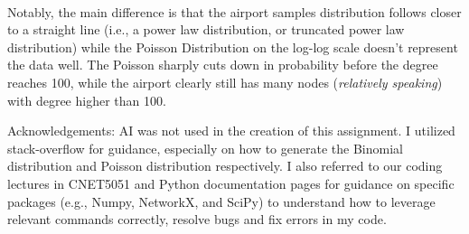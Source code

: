 \documentclass[11pt]{article}
\begin{document}
    \begin{center}
    \end{center}
    { \hspace*{\fill} \\}
    
    Notably, the main difference is that the airport samples distribution
follows closer to a straight line (i.e., a power law distribution, or
truncated power law distribution) while the Poisson Distribution on the
log-log scale doesn't represent the data well. The Poisson sharply cuts
down in probability before the degree reaches 100, while the airport
clearly still has many nodes (\emph{relatively speaking}) with degree
higher than 100.

Acknowledgements: \newline
AI was not used in the creation of this assignment. I utilized stack-overflow for guidance, especially on how to generate
the Binomial distribution and Poisson distribution respectively. I also referred to our coding lectures in CNET5051 and
Python documentation pages for guidance on specific packages (e.g., Numpy, NetworkX, and SciPy) to understand how to leverage
relevant commands correctly, resolve bugs and fix errors in my code.
    
    
\end{document}
